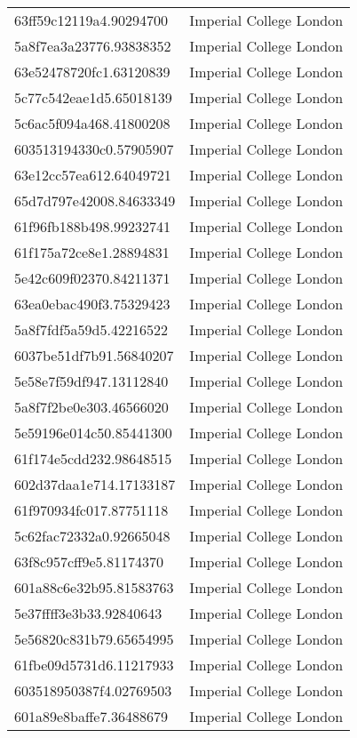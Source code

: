 \begin{tabular}{ll}
63ff59c12119a4.90294700 & Imperial College London \\
5a8f7ea3a23776.93838352 & Imperial College London \\
63e52478720fc1.63120839 & Imperial College London \\
5c77c542eae1d5.65018139 & Imperial College London \\
5c6ac5f094a468.41800208 & Imperial College London \\
603513194330c0.57905907 & Imperial College London \\
63e12cc57ea612.64049721 & Imperial College London \\
65d7d797e42008.84633349 & Imperial College London \\
61f96fb188b498.99232741 & Imperial College London \\
61f175a72ce8e1.28894831 & Imperial College London \\
5e42c609f02370.84211371 & Imperial College London \\
63ea0ebac490f3.75329423 & Imperial College London \\
5a8f7fdf5a59d5.42216522 & Imperial College London \\
6037be51df7b91.56840207 & Imperial College London \\
5e58e7f59df947.13112840 & Imperial College London \\
5a8f7f2be0e303.46566020 & Imperial College London \\
5e59196e014c50.85441300 & Imperial College London \\
61f174e5cdd232.98648515 & Imperial College London \\
602d37daa1e714.17133187 & Imperial College London \\
61f970934fc017.87751118 & Imperial College London \\
5c62fac72332a0.92665048 & Imperial College London \\
63f8c957cff9e5.81174370 & Imperial College London \\
601a88c6e32b95.81583763 & Imperial College London \\
5e37ffff3e3b33.92840643 & Imperial College London \\
5e56820c831b79.65654995 & Imperial College London \\
61fbe09d5731d6.11217933 & Imperial College London \\
603518950387f4.02769503 & Imperial College London \\
601a89e8baffe7.36488679 & Imperial College London \\

\end{tabular}
